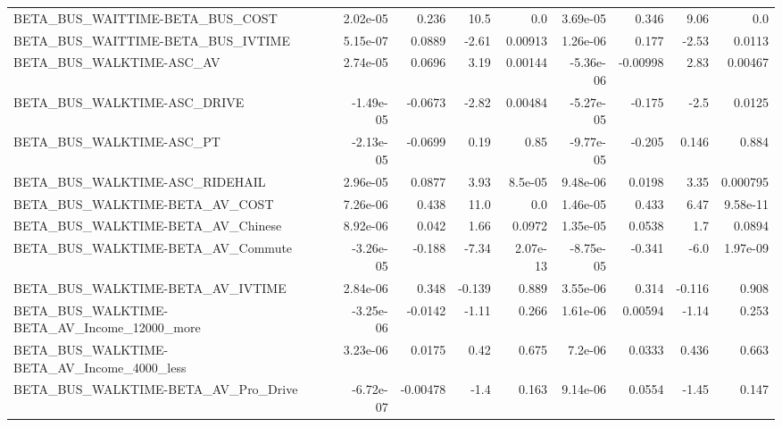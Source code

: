 \begin{tabular}{lrrrrrrrr}
BETA\_BUS\_WAITTIME-BETA\_BUS\_COST                    &    2.02e-05 &        0.236 &      10.5 &      0.0 &   3.69e-05 &       0.346 &         9.06 &           0.0 \\
BETA\_BUS\_WAITTIME-BETA\_BUS\_IVTIME                  &    5.15e-07 &       0.0889 &     -2.61 &  0.00913 &   1.26e-06 &       0.177 &        -2.53 &        0.0113 \\
BETA\_BUS\_WALKTIME-ASC\_AV                           &    2.74e-05 &       0.0696 &      3.19 &  0.00144 &  -5.36e-06 &    -0.00998 &         2.83 &       0.00467 \\
BETA\_BUS\_WALKTIME-ASC\_DRIVE                        &   -1.49e-05 &      -0.0673 &     -2.82 &  0.00484 &  -5.27e-05 &      -0.175 &         -2.5 &        0.0125 \\
BETA\_BUS\_WALKTIME-ASC\_PT                           &   -2.13e-05 &      -0.0699 &      0.19 &     0.85 &  -9.77e-05 &      -0.205 &        0.146 &         0.884 \\
BETA\_BUS\_WALKTIME-ASC\_RIDEHAIL                     &    2.96e-05 &       0.0877 &      3.93 &  8.5e-05 &   9.48e-06 &      0.0198 &         3.35 &      0.000795 \\
BETA\_BUS\_WALKTIME-BETA\_AV\_COST                     &    7.26e-06 &        0.438 &      11.0 &      0.0 &   1.46e-05 &       0.433 &         6.47 &      9.58e-11 \\
BETA\_BUS\_WALKTIME-BETA\_AV\_Chinese                  &    8.92e-06 &        0.042 &      1.66 &   0.0972 &   1.35e-05 &      0.0538 &          1.7 &        0.0894 \\
BETA\_BUS\_WALKTIME-BETA\_AV\_Commute                  &   -3.26e-05 &       -0.188 &     -7.34 & 2.07e-13 &  -8.75e-05 &      -0.341 &         -6.0 &      1.97e-09 \\
BETA\_BUS\_WALKTIME-BETA\_AV\_IVTIME                   &    2.84e-06 &        0.348 &    -0.139 &    0.889 &   3.55e-06 &       0.314 &       -0.116 &         0.908 \\
BETA\_BUS\_WALKTIME-BETA\_AV\_Income\_12000\_more        &   -3.25e-06 &      -0.0142 &     -1.11 &    0.266 &   1.61e-06 &     0.00594 &        -1.14 &         0.253 \\
BETA\_BUS\_WALKTIME-BETA\_AV\_Income\_4000\_less         &    3.23e-06 &       0.0175 &      0.42 &    0.675 &    7.2e-06 &      0.0333 &        0.436 &         0.663 \\
BETA\_BUS\_WALKTIME-BETA\_AV\_Pro\_Drive                &   -6.72e-07 &     -0.00478 &      -1.4 &    0.163 &   9.14e-06 &      0.0554 &        -1.45 &         0.147 \\

\end{tabular}
